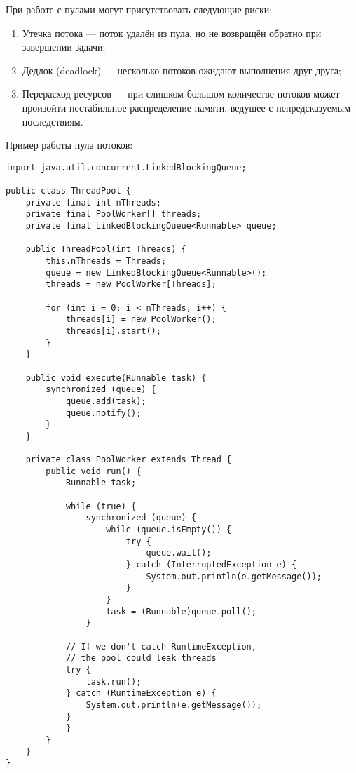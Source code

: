 При работе с пулами могут присутствовать следующие риски:

\begin{enumerate}
    \item Утечка потока — поток удалён из пула, но не возвращён обратно при завершении задачи;
    \item Дедлок (deadlock) — несколько потоков ожидают выполнения друг друга;
    \item Перерасход ресурсов — при слишком большом количестве потоков может произойти нестабильное распределение памяти, ведущее с непредсказуемым последствиям.
\end{enumerate}

Пример работы пула потоков:

\begin{lstlisting}
import java.util.concurrent.LinkedBlockingQueue;
 
public class ThreadPool {
    private final int nThreads;
    private final PoolWorker[] threads;
    private final LinkedBlockingQueue<Runnable> queue;
     
    public ThreadPool(int Threads) {
        this.nThreads = Threads;
        queue = new LinkedBlockingQueue<Runnable>();
        threads = new PoolWorker[Threads];
         
        for (int i = 0; i < nThreads; i++) {
            threads[i] = new PoolWorker();
            threads[i].start();
        }
    }
     
    public void execute(Runnable task) {
        synchronized (queue) {
            queue.add(task);
            queue.notify();
        }
    }
     
    private class PoolWorker extends Thread {
        public void run() {
            Runnable task;
             
            while (true) {
                synchronized (queue) {
                    while (queue.isEmpty()) {
                        try {
                            queue.wait();
                        } catch (InterruptedException e) {
                            System.out.println(e.getMessage());
                        }
                    }
                    task = (Runnable)queue.poll();
                }
         
            // If we don't catch RuntimeException,
            // the pool could leak threads
            try {
                task.run();
            } catch (RuntimeException e) {
                System.out.println(e.getMessage());
            }
            }
        }
    }
}
\end{lstlisting}

